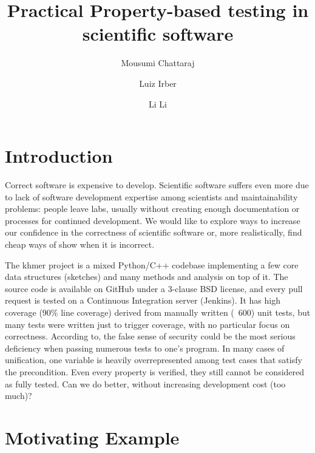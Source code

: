 \documentclass[preprint,nocopyrightspace]{sig-alternate}
\begin{document}
%

\title{Practical Property-based testing in scientific software}

\author{Mousumi Chattaraj}
\author{Luiz Irber}
\author{Li Li}


\maketitle


\section{Introduction}
Correct software is expensive to develop.
Scientific software suffers even more due to lack of software development expertise among scientists and maintainability problems:
people leave labs,
usually without creating enough documentation or processes for continued development.
We would like to explore ways to increase our confidence in the correctness of scientific software or,
more realistically,
find cheap ways of show when it is incorrect.

The khmer project is a mixed Python/C++ codebase implementing a few core data structures (sketches) and many methods and analysis on top of it.
The source code is available on GitHub under a 3-clause BSD license,
and every pull request is tested on a Continuous Integration server (Jenkins).
It has high coverage (90\% line coverage) derived from manually written (~600) unit tests,
but many tests were written just to trigger coverage,
with no particular focus on correctness.
According to\citet{claessen_quickcheck:_2011},
the false sense of security could be the most serious deficiency when passing numerous tests to one’s program.
In many cases of unification, one variable is heavily overrepresented among test cases that satisfy the precondition.
Even every property is verified, they still cannot be considered as fully tested.
Can we do better, without increasing development cost (too much)?

\section{Motivating Example}
\end{document}
